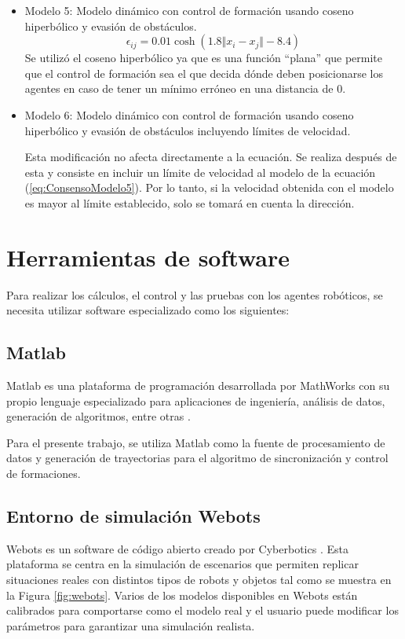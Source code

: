 \begin{itemize}
	\item Modelo 5: Modelo dinámico con control de formación usando coseno hiperbólico y evasión de obstáculos.
	\begin{equation}
		\epsilon_{ij} = 0.01\cosh{(1.8 \Vert x_i - x_j \Vert - 8.4)}
		\label{eq:ConsensoModelo5}
	\end{equation}
	Se utilizó el coseno hiperbólico ya que es una función ``plana'' que permite que el control de formación sea el que decida dónde deben posicionarse los agentes en caso de tener un mínimo erróneo en una distancia de 0.
	
	\item Modelo 6: Modelo dinámico con control de formación usando coseno hiperbólico y evasión de obstáculos incluyendo límites de velocidad.\par
	Esta modificación no afecta directamente a la ecuación. Se realiza después de esta y consiste en incluir un límite de velocidad al modelo de la ecuación (\ref{eq:ConsensoModelo5}). Por lo tanto, si la velocidad obtenida con el modelo es mayor al límite establecido, solo se tomará en cuenta la dirección.
	
\end{itemize}

\section{Herramientas de software}
Para realizar los cálculos, el control y las pruebas con los agentes robóticos, se necesita utilizar software especializado como los siguientes:

\subsection{Matlab}
Matlab es una plataforma de programación desarrollada por MathWorks con su propio lenguaje especializado para aplicaciones de ingeniería, análisis de datos, generación de algoritmos, entre otras \cite{matlab}.

Para el presente trabajo, se utiliza Matlab como la fuente de procesamiento de datos y generación de trayectorias para el algoritmo de sincronización y control de formaciones.

\subsection{Entorno de simulación Webots}
Webots es un software de código abierto creado por Cyberbotics \cite{webots}. Esta plataforma se centra en la simulación de escenarios que permiten replicar situaciones reales con distintos tipos de robots y objetos tal como se muestra en la Figura \ref{fig:webots}. Varios de los modelos disponibles en Webots están calibrados para comportarse como el modelo real y el usuario puede modificar los parámetros para garantizar una simulación realista.

